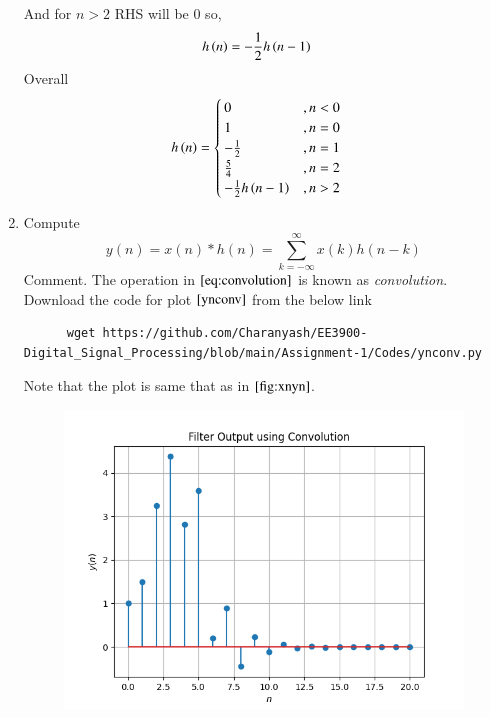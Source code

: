 \documentclass[journal,12pt,twocolumn]{IEEEtran}
\renewcommand\thesection{\arabic{section}}
\begin{document}
\begin{enumerate}[label=\thesection.\arabic*]
           And for $n>2$ RHS will be $0$ so,
           \begin{align}
                h\left(n\right) & = -\frac{1}{2}h\left(n-1\right)
           \end{align}
           Overall
           \begin{align}
                h\left(n\right) & = \begin{cases}
                                   0                       & , n <0  \\
                                   1                       & , n = 0 \\
                                   -\frac{1}{2}            & , n=1   \\
                                   \frac{5}{4}             & , n =2  \\
                                   -\frac{1}{2}h\left(n-1\right) & , n >2
                              \end{cases}
           \end{align}
     \item Compute
           \begin{equation}
                \label{eq:convolution}
                y(n) = x(n)*h(n) = \sum_{k=-\infty}^{\infty}x(k)h(n-k)
           \end{equation}
           Comment. The operation in $\eqref{eq:convolution}$ is known as
                {\em convolution}.\\
           \solution Download the code for plot $\ref{ynconv}$ from the below link
           \begin{lstlisting}
      wget https://github.com/Charanyash/EE3900-Digital_Signal_Processing/blob/main/Assignment-1/Codes/ynconv.py
            \end{lstlisting}
           Note that the plot is same that as in $\ref{fig:xnyn}$.
           \begin{figure}[ht!]
                \centering
                \includegraphics[width = \columnwidth]{figs/ynconv.png}

\end{figure}
\end{enumerate}
\end{document}
